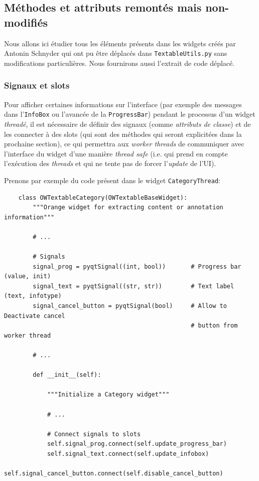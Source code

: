 \documentclass{article}
\begin{document}
\subsection{Méthodes et attributs remontés mais non-modifiés}

Nous allons ici étudier tous les éléments présents dans les widgets créés par Antonin Schnyder qui ont pu être déplacés dans \texttt{TextableUtils.py} sans modifications particulières. Nous fournirons aussi l'extrait de code déplacé.

\subsubsection{Signaux et slots}

Pour afficher certaines informations sur l'interface (par exemple des messages dans l'\texttt{InfoBox} ou l'avancée de la \texttt{ProgressBar}) pendant le processus d'un widget \textit{threadé}, il est nécessaire de définir des signaux (comme \textit{attributs de classe}) et de les connecter à des slots (qui sont des méthodes qui seront explicitées dans la prochaine section), ce qui permettra aux \textit{worker threads} de communiquer avec l'interface du widget d'une manière \textit{thread safe} (i.e. qui prend en compte l'exécution des \textit{threads} et qui ne tente pas de forcer l'\textit{update} de l'UI). 
\newline

Prenons par exemple du code présent dans le widget \texttt{CategoryThread}:


\begin{verbatim}
    class OWTextableCategory(OWTextableBaseWidget):
        """Orange widget for extracting content or annotation information"""

        # ...

        # Signals
        signal_prog = pyqtSignal((int, bool))       # Progress bar (value, init)
        signal_text = pyqtSignal((str, str))        # Text label (text, infotype)
        signal_cancel_button = pyqtSignal(bool)     # Allow to Deactivate cancel
                                                    # button from worker thread

        # ...
        
        def __init__(self):

            """Initialize a Category widget"""

            # ...

            # Connect signals to slots
            self.signal_prog.connect(self.update_progress_bar) 
            self.signal_text.connect(self.update_infobox)
            self.signal_cancel_button.connect(self.disable_cancel_button)
\end{verbatim}
\end{document}

